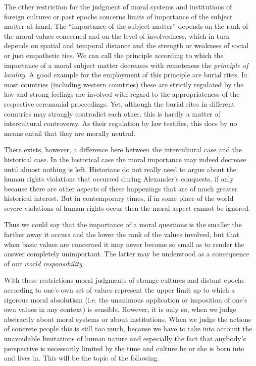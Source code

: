 \documentclass[12pt,a4paper,ngerman]{article}
\begin{document}
The other restriction for the judgment of moral systems and
institutions of foreign cultures or past epochs concerns limits of
importance of the subject matter at hand. The ``importance of the
subject matter'' depends on the rank of the moral values concerned and
on the level of involvedness, which in turn depends on spatial and
temporal distance and the strength or weakness of social or just
empathetic ties. We can call the principle according to which the
importance of a moral subject matter decreases with remoteness the
{\em principle of locality}. A good example for the employment of this
principle are burial rites. In most countries (including western
countries) these are strictly regulated by the law and strong feelings
are involved with regard to the appropriateness of the respective
ceremonial proceedings. Yet, although the burial rites in different
countries may strongly contradict each other, this is hardly a matter
of intercultural controversy. As their regulation by law testifies,
this does by no means entail that they are morally neutral.

There exists, however, a difference here between the
intercultural case and the historical case. In the historical case the moral
importance may indeed decrease until almost nothing is left. Historians do not
really need to argue about the human rights violations that occurred during
Alexander's conquests, if only because there are other aspects of these
happenings that are of much greater historical interest. But in contemporary
times, if in some place of the world severe violations of human
rights occur then the moral aspect cannot be ignored.

Thus we could say that the importance of a moral questions is the
smaller the farther away it occurs and the lower the rank of the
values involved, but that when basic values are concerned it may never
become so small as to render the answer completely unimportant.  The
latter may be understood as a consequence of our {\em world
  responsibility}.

With these restrictions moral judgments of strange cultures and
distant epochs according to one's own set of values represent the
upper limit up to which a rigorous moral absolutism (i.e. the
unanimous application or imposition of one's own values in any
context) is sensible. However, it is only so, when we judge abstractly
about moral systems or about institutions.  When we judge the actions
of concrete people this is still too much, because we have to take
into account the unavoidable limitations of human nature and
especially the fact that anybody's perspective is necessarily limited
by the time and culture he or she is born into and lives in. This will
be the topic of the following.
\end{document}

